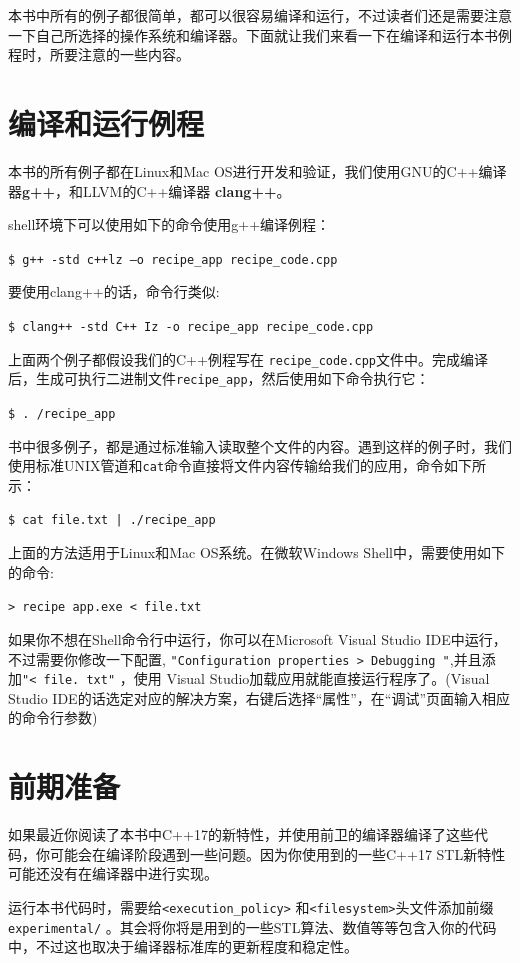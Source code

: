 本书中所有的例子都很简单，都可以很容易编译和运行，不过读者们还是需要注意一下自己所选择的操作系统和编译器。下面就让我们来看一下在编译和运行本书例程时，所要注意的一些内容。

\section{编译和运行例程}

本书的所有例子都在Linux和Mac OS进行开发和验证，我们使用GNU的C++编译器\textbf{g++}，和LLVM的C++编译器 \textbf{clang++}。

shell环境下可以使用如下的命令使用g++编译例程：

\texttt{\$ g++ -std c++lz —o recipe\_app recipe\_code.cpp }

要使用clang++的话，命令行类似:

\texttt{\$ clang++ -std C++ Iz -o recipe\_app recipe\_code.cpp }

上面两个例子都假设我们的C++例程写在 \texttt{recipe\_code.cpp}文件中。完成编译后，生成可执行二进制文件\texttt{recipe\_app}，然后使用如下命令执行它：

\texttt{\$ . /recipe\_app }

书中很多例子，都是通过标准输入读取整个文件的内容。遇到这样的例子时，我们使用标准UNIX管道和\texttt{cat}命令直接将文件内容传输给我们的应用，命令如下所示：

\texttt{\$ cat file.txt | ./recipe\_app}

上面的方法适用于Linux和Mac OS系统。在微软Windows Shell中，需要使用如下的命令:

\texttt{> recipe app.exe < file.txt}

如果你不想在Shell命令行中运行，你可以在Microsoft Visual Studio IDE中运行，不过需要你修改一下配置, \texttt{"Configuration properties > Debugging "},并且添加\texttt{"< file. txt"} ，使用 Visual Studio加载应用就能直接运行程序了。(Visual Studio IDE的话选定对应的解决方案，右键后选择“属性”，在“调试”页面输入相应的命令行参数)

\section{前期准备}

如果最近你阅读了本书中C++17的新特性，并使用前卫的编译器编译了这些代码，你可能会在编译阶段遇到一些问题。因为你使用到的一些C++17 STL新特性可能还没有在编译器中进行实现。

运行本书代码时，需要给\texttt{<execution\_policy>} 和\texttt{<filesystem>}头文件添加前缀\texttt{experimental/} 。其会将你将是用到的一些STL算法、数值等等包含入你的代码中，不过这也取决于编译器标准库的更新程度和稳定性。

